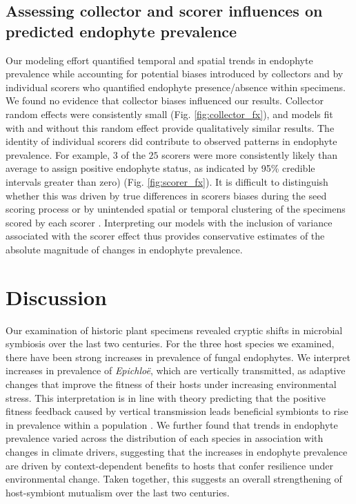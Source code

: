 \documentclass[11pt]{article}
\let\cite\citep
\begin{document}
\subsection*{Assessing collector and scorer influences on predicted endophyte prevalence}
Our modeling effort quantified temporal and spatial trends in endophyte prevalence while accounting for potential biases introduced by collectors and by individual scorers who quantified endophyte presence/absence within specimens. 
We found no evidence that collector biases influenced our results. 
Collector random effects were consistently small (Fig. \ref{fig:collector_fx}), and models fit with and without this random effect provide qualitatively similar results.
The identity of individual scorers did contribute to observed patterns in endophyte prevalence.
For example, $3$ of the $25$ scorers were more consistently likely than average to assign positive endophyte status, as indicated by 95\% credible intervals greater than zero) (Fig. \ref{fig:scorer_fx}). 
It is difficult to distinguish whether this was driven by true differences in scorers biases during the seed scoring process or by unintended spatial or temporal clustering of the specimens scored by each scorer \cite{clayton1993spatial,urdangarin2023evaluating}. 
Interpreting our models with the inclusion of variance associated with the scorer effect thus provides conservative estimates of the absolute magnitude of changes in endophyte prevalence.


\section*{Discussion}
Our examination of historic plant specimens revealed cryptic shifts in microbial symbiosis over the last two centuries. 
For the three host species we examined, there have been strong increases in prevalence of fungal endophytes.
We interpret increases in prevalence of \emph{Epichloë}, which are vertically transmitted, as adaptive changes that improve the fitness of their hosts under increasing environmental stress.
This interpretation is in line with theory predicting that the positive fitness feedback caused by vertical transmission leads beneficial symbionts to rise in prevalence within a population \cite{fine1975vectors,donald2021context}.
We further found that trends in endophyte prevalence varied across the distribution of each species in association with changes in climate drivers, suggesting that the increases in endophyte prevalence are driven by context-dependent benefits to hosts that confer resilience under environmental change.
Taken together, this suggests an overall strengthening of host-symbiont mutualism over the last two centuries.
\end{document}
